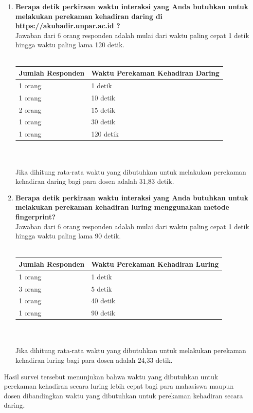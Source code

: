 \begin{enumerate}
	\item \textbf{Berapa detik perkiraan waktu interaksi yang Anda butuhkan untuk melakukan perekaman kehadiran daring di \url{https://akuhadir.unpar.ac.id} ?}\\
	Jawaban dari 6 orang responden adalah mulai dari waktu paling cepat 1 detik hingga waktu paling lama 120 detik.\\ \\
	\begin{tabular}{|p{4cm} |p{7cm}|}
		\hline
		Jumlah Responden &  Waktu Perekaman Kehadiran Daring \\ \hline     
		1 orang &  1 detik\\ \hline 
		1 orang &  10 detik\\ \hline 
		2 orang &  15 detik\\ \hline 
		1 orang &  30 detik\\ \hline 
		1 orang &  120 detik\\ \hline 
	\end{tabular}\\ \\
	Jika dihitung rata-rata waktu yang dibutuhkan untuk melakukan perekaman kehadiran daring bagi para dosen adalah 31,83 detik.
	
	\item \textbf{Berapa detik perkiraan waktu interaksi yang Anda butuhkan untuk melakukan perekaman kehadiran luring menggunakan metode fingerprint?}\\
	Jawaban dari 6 orang responden adalah mulai dari waktu paling cepat 1 detik hingga waktu paling lama 90 detik.\\ \\
	\begin{tabular}{|p{4cm} |p{7cm}|}
		\hline
		Jumlah Responden &  Waktu Perekaman Kehadiran Luring \\ \hline     
		1 orang &  1 detik\\ \hline 
		3 orang &  5 detik\\ \hline 
		1 orang &  40 detik\\ \hline 
		1 orang &  90 detik\\ \hline 
	\end{tabular}\\ \\
	Jika dihitung rata-rata waktu yang dibutuhkan untuk melakukan perekaman kehadiran luring bagi para dosen adalah 24,33 detik.
\end{enumerate}
	Hasil survei tersebut menunjukan bahwa waktu yang dibutuhkan untuk perekaman kehadiran secara luring lebih cepat bagi para mahasiswa maupun dosen dibandingkan waktu yang dibutuhkan untuk perekaman kehadiran secara daring. 

